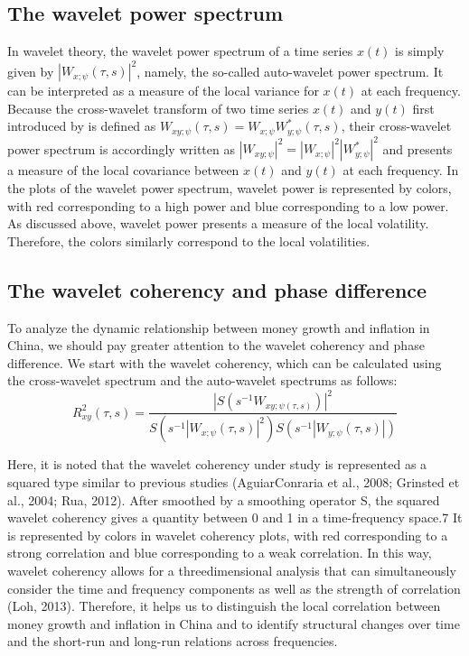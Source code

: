 \documentclass[a4paper,fleqn]{cas-sc}
\begin{document}
\subsection{The wavelet power spectrum}
In wavelet theory, the wavelet power spectrum of a time series $x(t)$ is simply given by $|W_{x;\psi}(\tau, s)|^2$, namely, the so-called auto-wavelet power spectrum. It can be interpreted as a measure of the local variance for $x(t)$ at each frequency. Because the cross-wavelet transform of two time series $x(t)$ and $y(t)$ first introduced by \citet*{PhysRevLett.71.3279} is defined as $W_{xy;\psi}(\tau,s)=W_{x;\psi}W_{y;\psi}^* (\tau,s)$, their cross-wavelet power spectrum is accordingly written as  $|W_{xy;\psi}|^2=|W_{x;\psi}|^2 |W^*_{y;\psi}|^2$ and presents a measure of the local covariance between $x(t)$ and $y(t)$ at each frequency. In the plots of the wavelet power spectrum, wavelet power is represented by colors, with red corresponding to a high power and blue corresponding to a low power. As discussed above, wavelet power presents a measure of the local volatility. Therefore, the colors similarly correspond to the local volatilities.

\subsection{The wavelet coherency and phase difference} \label{sec:3.3}
To analyze the dynamic relationship between money growth and inflation in China, we should pay greater attention to the wavelet coherency and phase difference. We start with the wavelet coherency, which can be calculated using the cross-wavelet spectrum and the auto-wavelet spectrums as follows:
\begin{equation}
    R^{2}_{xy}(\tau,s)=\frac{\left|S\left(s^{-1}W_{xy;\psi(\tau,s)}\right)\right|^2}{S\left(s^{-1}\left|W_{x;\psi}(\tau,s)\right|^2\right)S\left(s^{-1}\left|W_{y;\psi}(\tau,s)\right|\right)}
\end{equation}

Here, it is noted that the wavelet coherency under study is represented as a squared type similar to previous studies (AguiarConraria et al., 2008; Grinsted et al., 2004; Rua, 2012). After smoothed by a smoothing operator S, the squared wavelet coherency gives a quantity between 0 and 1 in a time-frequency space.7 It is represented by colors in wavelet coherency plots, with red corresponding to a strong correlation and blue corresponding to a weak correlation. In this way, wavelet coherency allows for a threedimensional analysis that can simultaneously consider the time and frequency components as well as the strength of correlation (Loh, 2013). Therefore, it helps us to distinguish the local correlation between money growth and inflation in China and to identify structural changes over time and the short-run and long-run relations across frequencies.
\end{document}
